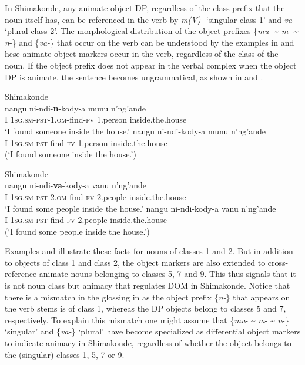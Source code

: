 \documentclass[output=paper]{langsci/langscibook}
\begin{document}
{In Shimakonde, any animate object DP, regardless of the class prefix that the noun itself has, can be referenced in the verb by }{\textit{m(V)- }}{‘singular class 1’ and }{\textit{va-}} {‘plural class 2’. }{The morphological distribution of the object prefixes }{\{}{\textit{mu}}{- {\textasciitilde} }{\textit{m}}{- {\textasciitilde} }{\textit{n}}{-\} and \{}{\textit{va-}}{\} that occur on the verb }{can be understood by the examples in } {and} hese animate object markers occur in the verb, regardless of the class of the noun. {If the object prefix does not appear in the verbal complex when the object DP is animate, the sentence becomes ungrammatical, as shown in } {and} .


\ea\label{ex:nguna:9}
\ea
{Shimakonde}\\
\gll nangu       ni-ndi-\textbf{n}-kody-a                      munu            n'ng'ande\\
     I               \textsc{1sg.sm-pst}-1.\textsc{om}-find-\textsc{fv}       1.person       inside.the.house\\
\glt ‘I found someone inside the house.’
\ex\label{ex:nguna:}
\gll *nangu     ni-ndi-kody-a                         munu            n'ng'ande\\
     I               \textsc{1sg.sm-pst}-find-\textsc{fv}                1.person       inside.the.house\\
\glt (‘I found someone inside the house.’)
\z
\z


\ea\label{ex:nguna:10}
\ea
{Shimakonde}\\
\gll nangu      ni-ndi-\textbf{va}-kody-a                     vanu             n'ng'ande\\
     I              \textsc{1sg.sm-pst-2.om}-find-\textsc{fv}        2.people       inside.the.house\\
\glt ‘I found some people inside the house.’
\ex\label{ex:nguna:}
\gll *nangu     ni-ndi-kody-a                        vanu              n'ng'ande\\
     I               \textsc{1sg.sm-pst}-find-\textsc{fv}               2.people        inside.the.house\\
\glt (‘I found some people inside the house.’)
\z
\z

Examples  {and }  illustrate these facts for nouns of classes 1 and 2. But in addition to objects of class 1 and class 2, the object markers are also extended to cross-reference animate nouns belonging to classes 5, 7 and 9. This thus signals that {it is not noun class but animacy }that regulates DOM in Shimakonde. Notice that there is a mismatch in the glossing in  as the object prefix  \{{\textit{n-}}\} that appears on the verb stems is of class 1, whereas the DP objects belong to classes 5 and 7, respectively. To explain this mismatch one might assume that \{{\textit{mu}}- {\textasciitilde} {\textit{m}}- {\textasciitilde} {\textit{n}}-\} ‘singular’ and \{\textit{va-}\} ‘plural’ have become specialized as differential object markers to indicate animacy in Shimakonde, regardless of whether the object belongs to the (singular) classes 1, 5, 7 or 9.
\end{document}
